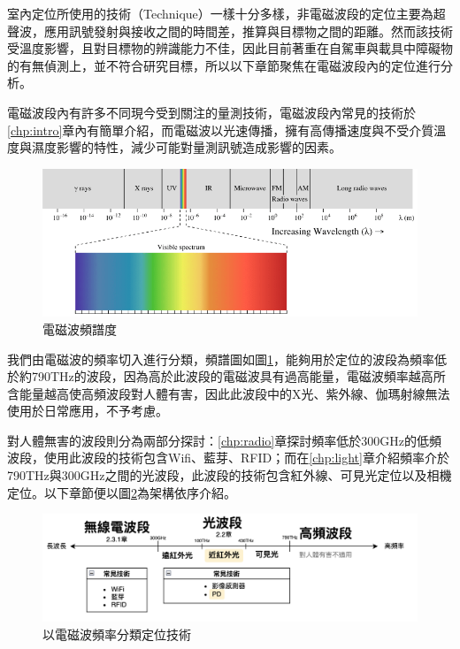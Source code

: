     室內定位所使用的技術（Technique）一樣十分多樣，非電磁波段的定位主要為超聲波，應用訊號發射與接收之間的時間差，推算與目標物之間的距離。然而該技術受溫度影響，且對目標物的辨識能力不佳，因此目前著重在自駕車與載具中障礙物的有無偵測上\cite{survey_ultrasonic}，並不符合研究目標，所以以下章節聚焦在電磁波段內的定位進行分析。

    電磁波段內有許多不同現今受到關注的量測技術，電磁波段內常見的技術於\ref{chp:intro}章內有簡單介紹，而電磁波以光速傳播，擁有高傳播速度與不受介質溫度與濕度影響的特性，減少可能對量測訊號造成影響的因素。

    \begin{figure}[h]
        \centering
        \includegraphics[width=12cm]{ch2pic/electro_spectrum.png}
        \caption{電磁波頻譜度\cite{Spectrum}}
        \label{pic:spectrum}
    \end{figure}

    我們由電磁波的頻率切入進行分類，頻譜圖如圖\ref{pic:spectrum}，能夠用於定位的波段為頻率低於約790THz的波段，因為高於此波段的電磁波具有過高能量，電磁波頻率越高所含能量越高使高頻波段對人體有害，因此此波段中的X光、紫外線、伽瑪射線無法使用於日常應用，不予考慮。

    對人體無害的波段則分為兩部分探討：\ref{chp:radio}章探討頻率低於300GHz的低頻波段\cite{book_electromagnetic}，使用此波段的技術包含Wifi、藍芽、RFID；而在\ref{chp:light}章介紹頻率介於790THz與300GHz之間的光波段，此波段的技術包含紅外線、可見光定位以及相機定位。以下章節便以圖\ref{pic:electro_sort}為架構依序介紹。


    \begin{figure}[h]
        \centering
        \includegraphics[width=13cm]{ch2pic/electro_sort.png}
        \caption{以電磁波頻率分類定位技術}
        \label{pic:electro_sort}
    \end{figure}

